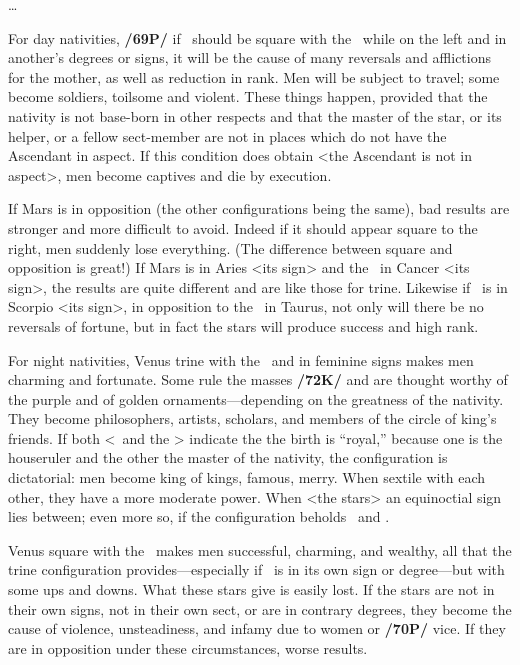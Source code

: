 \ldots

For day nativities, \textbf{/69P/} if \Mars\, \marginnote{\Mars \Square \Moon} should be square with the \Moon\, while on the left and in another’s degrees or signs, it will be the cause of many reversals and afflictions for the mother, as well as reduction in rank. Men will be subject to travel; some become soldiers, toilsome and violent. These things happen, provided that the nativity is not base-born in other respects and that the master of the star, or its helper, or a fellow sect-member are not in places which do not have the Ascendant in aspect. If this condition does obtain <the Ascendant is not in aspect>, men become captives and die by execution. 

If Mars is in opposition (the other configurations being the same), bad results are stronger and more difficult to avoid. Indeed if it should appear square to the right, men suddenly lose everything. (The difference between square and opposition is great!) \mndl If Mars is in Aries <its sign> and the \Moon\, in Cancer <its sign>, the results are quite different and are like those for trine. Likewise if \Mars\, is in Scorpio <its sign>, in opposition to the \Moon\, in Taurus, not only will there be no reversals of fortune, but in fact the stars will produce success and high rank.

For night nativities, Venus \marginnote{\Venus \Trine \Moon} trine with the \Moon\, and in feminine signs makes men charming and fortunate. Some rule the masses \textbf{/72K/} and are thought worthy of the purple and of golden ornaments—depending on the greatness of the nativity. They become philosophers, artists, scholars, and members of
the circle of king’s friends. If both <\Venus\, and the \Moon> indicate the the birth is “royal,” because one is
the houseruler and the other the master of the nativity, the configuration is dictatorial: men become king of kings, famous, merry. When sextile with each other, they have a more moderate power. When <the stars> an equinoctial sign lies between; even more so, if the configuration beholds \Pisces\, and \Taurus.

Venus \marginnote{\Venus \Square \Moon} square with the \Moon\, makes men successful, charming, and wealthy, all that the trine configuration provides—especially if \Venus\, is in its own sign or degree—but with some ups and downs. \mndl What these stars give is easily lost. If the stars are not in their own signs, not in their own sect, or are in contrary degrees, they become the cause of violence, unsteadiness, and infamy due to women or \textbf{/70P/} vice.
If they are in opposition under these circumstances, worse results.

